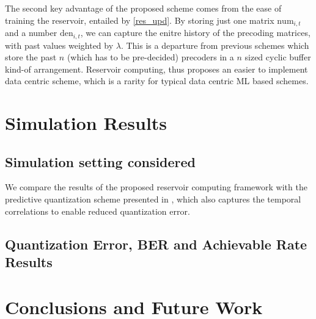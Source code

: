 \documentclass[conference]{IEEEtran}
\begin{document}
The second key advantage of the proposed scheme comes from the ease of training the reservoir, entailed by \eqref{res_upd}. 
By storing just one matrix $\text{num}_{i,t}$ and a number $\text{den}_{i,t}$, we can capture the enitre history of the precoding matrices, with past values weighted by $\lambda$. 
This is a departure from previous schemes \cite{Gupt1905:Predictive,6891198,6545375} which store the past $n$ (which has to be pre-decided) precoders in a $n$ sized cyclic buffer kind-of arrangement.
Reservoir computing, thus proposes an easier to implement data centric scheme, which is a rarity for typical data centric ML based schemes. 


\section{Simulation Results}
\label{section4}
\subsection{Simulation setting considered}
\label{setting}
\noindent We compare the results of the proposed reservoir computing framework with the predictive quantization scheme presented in \cite{6891198}, which also captures the temporal correlations to enable reduced quantization error.
\subsection{Quantization Error, BER and Achievable Rate Results}
\label{res}
\section{Conclusions and Future Work}
\label{section5}




\renewcommand{\bibfont}{\footnotesize}


\end{document}
